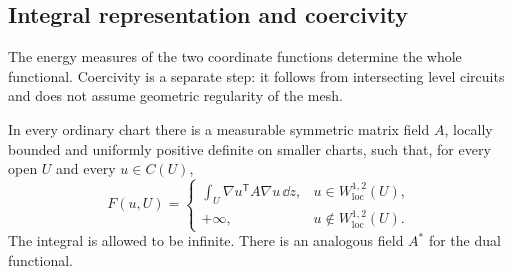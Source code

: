 \subsection{Integral representation and coercivity}

The energy measures of the two coordinate functions determine the
whole functional.  Coercivity is a separate step: it follows from
intersecting level circuits and does not assume geometric regularity of
the mesh.

\begin{proposition}\label{en:representation}
In every ordinary chart there is a measurable symmetric matrix field
$A$, locally bounded and uniformly positive definite on smaller charts,
such that, for every open $U$ and every $u\in C(U)$,
\begin{equation}\label{en:matrix-form}
 F(u,U)=
 \begin{cases}
 \displaystyle\int_U\nabla u^{\mathsf T}A\nabla u\,\dd z,
                &u\in W^{1,2}_{\mathrm{loc}}(U),\\[4pt]
 +\infty,       &u\notin W^{1,2}_{\mathrm{loc}}(U).
 \end{cases}
\end{equation}
The integral is allowed to be infinite.  There is an analogous field
$A^*$ for the dual functional.
\end{proposition}

